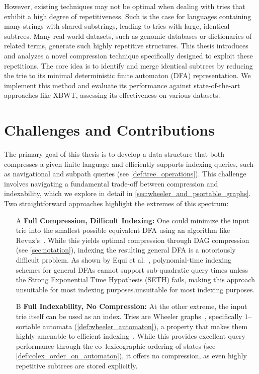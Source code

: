 However, existing techniques may not be optimal when dealing with tries that exhibit a high degree of repetitiveness. Such is the case for languages containing many strings with shared substrings, leading to tries with large, identical subtrees. Many real-world datasets, such as genomic databases or dictionaries of related terms, generate such highly repetitive structures. This thesis introduces and analyzes a novel compression technique specifically designed to exploit these repetitions. The core idea is to identify and merge identical subtrees by reducing the trie to its minimal deterministic finite automaton (DFA) representation. We implement this method and evaluate its performance against state-of-the-art approaches like XBWT, assessing its effectiveness on various datasets.

\section{Challenges and Contributions}
The primary goal of this thesis is to develop a data structure that both compresses a given finite language and efficiently supports indexing queries, such as navigational and subpath queries (see \cref{def:tree_operations}). This challenge involves navigating a fundamental trade-off between compression and indexability, which we explore in detail in \cref{sec:wheeler_and_psortable_graphs}. Two straightforward approaches highlight the extremes of this spectrum:

\begin{enumerate}
    \item[A] \textbf{Full Compression, Difficult Indexing:} One could minimize the input trie into the smallest possible equivalent DFA using an algorithm like Revuz's~\cite{revuz1992minimisation}. While this yields optimal compression through DAG compression (see \cref{sec:notation}), indexing the resulting general DFA is a notoriously difficult problem. As shown by Equi et al.~\cite{equiGraphsCannotBe2023}, polynomial-time indexing schemes for general DFAs cannot support sub-quadratic query times unless the Strong Exponential Time Hypothesis (SETH) fails, making this approach unsuitable for most indexing purposes.unsuitable for most indexing purposes.
    
    \item[B] \textbf{Full Indexability, No Compression:} At the other extreme, the input trie itself can be used as an index. Tries are Wheeler graphs~\cite{gagie2017wheeler}, specifically $1$--sortable automata (\cref{def:wheeler_automaton}), a property that makes them highly amenable to efficient indexing~\cite{cotumaccio2023co}. While this provides excellent query performance through the co--lexicographic ordering of states (see \cref{def:colex_order_on_automaton}), it offers no compression, as even highly repetitive subtrees are stored explicitly.
\end{enumerate}

